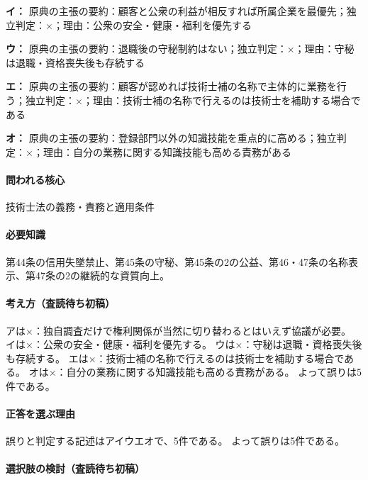 \noindent\textbf{イ：} 原典の主張の要約：顧客と公衆の利益が相反すれば所属企業を最優先；独立判定：×；理由：公衆の安全・健康・福利を優先する\par

\noindent\textbf{ウ：} 原典の主張の要約：退職後の守秘制約はない；独立判定：×；理由：守秘は退職・資格喪失後も存続する\par

\noindent\textbf{エ：} 原典の主張の要約：顧客が認めれば技術士補の名称で主体的に業務を行う；独立判定：×；理由：技術士補の名称で行えるのは技術士を補助する場合である\par

\noindent\textbf{オ：} 原典の主張の要約：登録部門以外の知識技能を重点的に高める；独立判定：×；理由：自分の業務に関する知識技能も高める責務がある\par

\paragraph{問われる核心} 技術士法の義務・責務と適用条件

\paragraph{必要知識} 第44条の信用失墜禁止、第45条の守秘、第45条の2の公益、第46・47条の名称表示、第47条の2の継続的な資質向上。

\paragraph{考え方（査読待ち初稿）} アは×：独自調査だけで権利関係が当然に切り替わるとはいえず協議が必要。 イは×：公衆の安全・健康・福利を優先する。 ウは×：守秘は退職・資格喪失後も存続する。 エは×：技術士補の名称で行えるのは技術士を補助する場合である。 オは×：自分の業務に関する知識技能も高める責務がある。 よって誤りは5件である。

\paragraph{正答を選ぶ理由} 誤りと判定する記述はアイウエオで、5件である。  よって誤りは5件である。

\paragraph{選択肢の検討（査読待ち初稿）}\mbox{}\par

